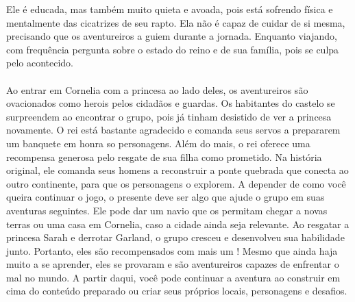 Ele é educada, mas também muito quieta e avoada, pois está sofrendo física e mentalmente das cicatrizes de seu rapto.
Ela não é capaz de cuidar de si mesma, precisando que os aventureiros a guiem durante a jornada. Enquanto viajando, com frequência pergunta sobre o estado do reino e de sua família, pois se culpa pelo acontecido.
%
\vfill
%
\\\\
%
Ao entrar em Cornelia com a princesa ao lado deles, os aventureiros são ovacionados como herois pelos cidadãos e guardas.
Os habitantes do castelo se surpreendem ao encontrar o grupo, pois já tinham desistido de ver a princesa novamente.
O rei está bastante agradecido e comanda seus servos a prepararem um banquete em honra so personagens.
Além do mais, o rei oferece uma recompensa generosa pelo resgate de sua filha como prometido.
Na história original, ele comanda seus homens a reconstruir a ponte quebrada que conecta ao outro continente, para que os personagens o explorem. A depender de como você queira continuar o jogo, o presente deve ser algo que ajude o grupo em suas aventuras seguintes.
Ele pode dar um navio que os permitam chegar a novas terras ou uma casa em Cornelia, caso a cidade ainda seja relevante. 
Ao resgatar a princesa Sarah e derrotar Garland, o grupo cresceu e desenvolveu sua habilidade junto.
Portanto, eles são recompensados com mais um ! 
Mesmo que ainda haja muito a se aprender, eles se provaram e são aventureiros capazes de enfrentar o mal no mundo.
A partir daqui, você pode continuar a aventura ao construir em cima do conteúdo preparado ou criar seus próprios locais, personagens e desafios.
%
\clearpage